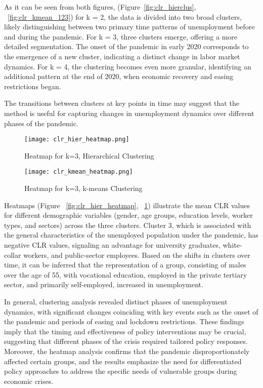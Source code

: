 \documentclass[a4paper,12pt]{article}
\begin{document}
As it can be seen from both figures, (Figure~\ref{fig:clr_hierclus}, ~\ref{fig:clr_kmean_123}) for k = 2, the data is divided into two broad clusters, likely distinguishing between two primary time patterns of unemployment before and during the pandemic. For k = 3, three clusters emerge, offering a more detailed segmentation. The onset of the pandemic in early 2020 corresponds to the emergence of a new cluster, indicating a distinct change in labor market dynamics. For k = 4, the clustering becomes even more granular, identifying an additional pattern at the end of 2020, when economic recovery and easing restrictions began.

The transitions between clusters at key points in time may suggest that the method is useful for capturing changes in unemployment dynamics over different phases of the pandemic.

\begin{figure}[H]
    \centering
    \begin{minipage}{0.48\textwidth}
        \centering
        \texttt{[image: clr\_hier\_heatmap.png]}
        \caption{Heatmap for k=3, Hierarchical Clustering}
        \label{fig:clr_hier_heatmap}
    \end{minipage}
    \hfill
    \begin{minipage}{0.48\textwidth}
        \centering
        \texttt{[image: clr\_kmean\_heatmap.png]}
        \caption{Heatmap for k=3, k-means Clustering}
        \label{fig:clr_kmean_heatmap}
    \end{minipage}
\end{figure}


Heatmaps (Figure ~\ref{fig:clr_hier_heatmap}, ~\ref{fig:clr_kmean_heatmap}) illustrate the mean CLR values for different demographic variables (gender, age groups, education levels, worker types, and sectors) across the three clusters. Cluster 3, which is associated with the general characteristics of the unemployed population under the pandemic, has negative CLR values, signaling an advantage for university graduates, white-collar workers, and public-sector employees. Based on the shifts in clusters over time, it can be inferred that the representation of a group, consisting of males over the age of 55, with vocational education, employed in the private tertiary sector, and primarily self-employed, increased in unemployment.

In general, clustering analysis revealed distinct phases of unemployment dynamics, with significant changes coinciding with key events such as the onset of the pandemic and periods of easing and lockdown restrictions.
These findings imply that the timing and effectiveness of policy interventions may be crucial, suggesting that different phases of the crisis required tailored policy responses. Moreover, the heatmap analysis confirms that the pandemic disproportionately affected certain groups, and the results emphasize the need for differentiated policy approaches to address the specific needs of vulnerable groups during economic crises.
\end{document}
